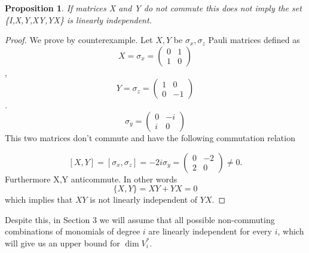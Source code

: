\documentclass[11pt]{amsart}
\newtheorem{proposition}[theorem]{Proposition}
\numberwithin{equation}{section}
\numberwithin{figure}{section}
\numberwithin{theorem}{section}
\begin{document}
\begin{proposition}
If matrices X and Y do not commute this does not imply the set \{I,X,Y,XY,YX\} is linearly independent. 
\end{proposition}
\begin{proof}
We prove by counterexample. Let $X,Y$ be $\sigma_x, \sigma_z$ Pauli matrices defined as 
$$X=\sigma_x=\begin{pmatrix}0&1\\1&0\end{pmatrix}$$, $$Y=\sigma_z=\begin{pmatrix}1&0\\0&-1\end{pmatrix}$$.
$$\sigma_y=\begin{pmatrix}0&-i\\i&0\end{pmatrix}$$
This two matrices don't commute and have the following commutation relation

$$[X,Y]=[\sigma_x,\sigma_z]=-2i \sigma_y=\begin{pmatrix}0&-2\\2&0\end{pmatrix}\neq 0. $$
Furthermore X,Y anticommute. In other words
$$\{X,Y\}=XY+YX=0$$
which implies that $XY$ is not linearly independent of $YX$.
 
\end{proof}
Despite this, in Section 3 we will assume that all possible non-commuting combinations of monomials of degree $i$ are linearly independent for every $i$, which will give us an upper bound for $\dim V^*_i$. 
\end{document}
